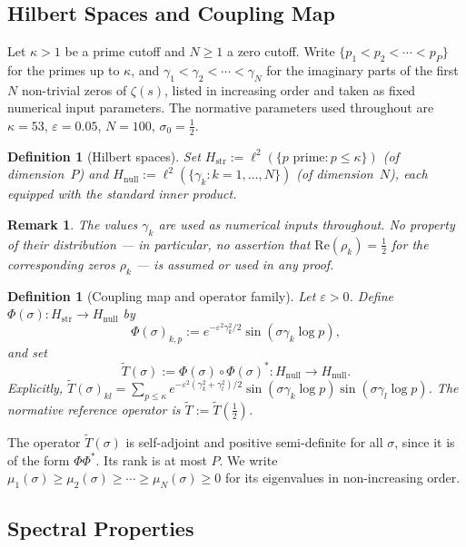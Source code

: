 \documentclass[11pt]{article}
\newtheorem{definition}[theorem]{Definition}
\newtheorem*{remark}{Remark}
\newcommand{\Hstr}{H_{\mathrm{str}}}
\newcommand{\Hnull}{H_{\mathrm{null}}}
\newcommand{\Tt}{\widetilde{T}}
\begin{document}
\subsection{Hilbert Spaces and Coupling Map}

Let $\kappa>1$ be a prime cutoff and $N\geq 1$ a zero cutoff.
Write $\{p_1<p_2<\cdots<p_P\}$ for the primes up to $\kappa$,
and $\gamma_1<\gamma_2<\cdots<\gamma_N$ for the imaginary parts
of the first $N$ non-trivial zeros of $\zeta(s)$, listed in
increasing order and taken as fixed numerical input parameters.
The normative parameters used throughout are
$\kappa=53$, $\varepsilon=0.05$, $N=100$, $\sigma_0=\tfrac{1}{2}$.

\begin{definition}[Hilbert spaces]
\label{def:spaces}
Set $\Hstr := \ell^2(\{p\text{ prime}: p\leq\kappa\})$
(of dimension~$P$) and $\Hnull := \ell^2(\{\gamma_k: k=1,\ldots,N\})$
(of dimension~$N$), each equipped with the standard inner product.
\end{definition}

\begin{remark}
The values $\gamma_k$ are used as numerical inputs throughout.
No property of their distribution --- in particular, no assertion
that $\mathrm{Re}(\rho_k)=\tfrac{1}{2}$ for the corresponding
zeros $\rho_k$ --- is assumed or used in any proof.
\end{remark}

\begin{definition}[Coupling map and operator family]
\label{def:coupling}
Let $\varepsilon>0$.
Define $\Phi(\sigma)\colon\Hstr\to\Hnull$ by
\[
\Phi(\sigma)_{k,p} := e^{-\varepsilon^2\gamma_k^2/2}\sin(\sigma\gamma_k\log p),
\]
and set
\[
\Tt(\sigma) := \Phi(\sigma)\circ\Phi(\sigma)^*\colon\Hnull\to\Hnull.
\]
Explicitly,
$\Tt(\sigma)_{kl}
  = \sum_{p\leq\kappa} e^{-\varepsilon^2(\gamma_k^2+\gamma_l^2)/2}
    \sin(\sigma\gamma_k\log p)\sin(\sigma\gamma_l\log p)$.
The normative reference operator is $\Tt := \Tt(\tfrac{1}{2})$.
\end{definition}

The operator $\Tt(\sigma)$ is self-adjoint and positive semi-definite
for all $\sigma$, since it is of the form $\Phi\Phi^*$.
Its rank is at most $P$.
We write $\mu_1(\sigma)\geq\mu_2(\sigma)\geq\cdots\geq\mu_N(\sigma)\geq 0$
for its eigenvalues in non-increasing order.

\subsection{Spectral Properties}
\label{ssec:spectral}
\end{document}
